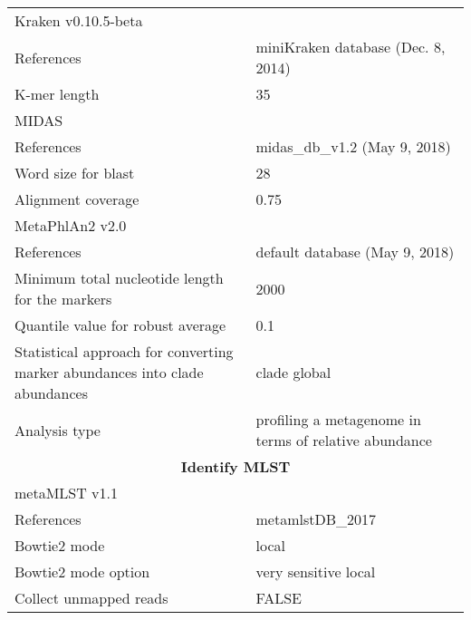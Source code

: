 \begin{table}[h!]
{\begin{tabular}{ll}
Kraken v0.10.5-beta                                &                                    \\
References                                         & miniKraken database (Dec. 8, 2014) \\
K-mer length                                       & 35                                 \\
MIDAS                                              &                                    \\
References                                         & midas\_db\_v1.2 (May 9, 2018)      \\
Word size for blast                                & 28                                 \\
Alignment coverage                                 & 0.75                               \\
MetaPhlAn2 v2.0                                    &                                    \\
References                                         & default database (May 9, 2018)     \\
Minimum total nucleotide length for the markers    & 2000                               \\
Quantile value for robust average                  & 0.1                                \\
Statistical approach for converting marker abundances into clade abundances & clade global                                          \\
Analysis type                                                               & profiling a metagenome in terms of relative abundance \\
\midrule
\multicolumn{2}{c}{\textbf{Identify MLST}}                                                       \\\midrule
metaMLST v1.1                                      &                                    \\
References                                         & metamlstDB\_2017                   \\
Bowtie2 mode                                       & local                              \\
Bowtie2 mode option                                & very sensitive local               \\
Collect unmapped reads                             & FALSE                              \\

\end{tabular}}
\end{table}
